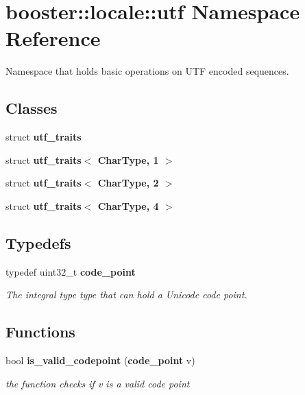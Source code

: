 \section{booster\+:\+:locale\+:\+:utf Namespace Reference}
\label{namespacebooster_1_1locale_1_1utf}


Namespace that holds basic operations on U\+TF encoded sequences.  


\subsection*{Classes}
\begin{DoxyCompactItemize}
\item 
struct {\bf utf\+\_\+traits}
\item 
struct {\bf utf\+\_\+traits$<$ Char\+Type, 1 $>$}
\item 
struct {\bf utf\+\_\+traits$<$ Char\+Type, 2 $>$}
\item 
struct {\bf utf\+\_\+traits$<$ Char\+Type, 4 $>$}
\end{DoxyCompactItemize}
\subsection*{Typedefs}
\begin{DoxyCompactItemize}
\item 
typedef uint32\+\_\+t {\bf code\+\_\+point}\label{namespacebooster_1_1locale_1_1utf_a99fa30e51629ed1d20e5989b9f36effc}

\begin{DoxyCompactList}\small\item\em The integral type type that can hold a Unicode code point. \end{DoxyCompactList}\end{DoxyCompactItemize}
\subsection*{Functions}
\begin{DoxyCompactItemize}
\item 
bool {\bf is\+\_\+valid\+\_\+codepoint} ({\bf code\+\_\+point} v)\label{namespacebooster_1_1locale_1_1utf_a75c67e9ea9fa30bade54917264b1a19b}

\begin{DoxyCompactList}\small\item\em the function checks if {\itshape v} is a valid code point \end{DoxyCompactList}\end{DoxyCompactItemize}
